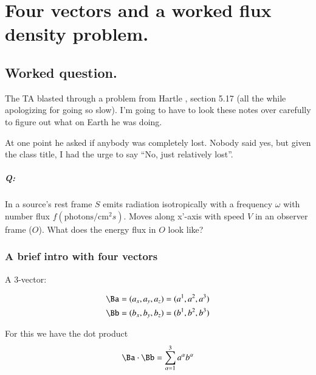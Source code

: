 %
%

\chapter{Four vectors and a worked flux density problem.}
\label{chap:relativisticElectrodynamicsT1}
{}
\date{Jan 20, 2011}

\beginArtNoToc

\section{Worked question.}

The TA blasted through a problem from Hartle \cite{hartle2003gravity}, section 5.17 (all the while apologizing for going so slow).  I'm going to have to look these notes over carefully to figure out what on Earth he was doing.

At one point he asked if anybody was completely lost.  Nobody said yes, but given the class title, I had the urge to say ``No, just relatively lost''.

\paragraph{Q:}
In a source's rest frame $S$ emits radiation isotropically with a frequency $\omega$ with number flux $f(\text{photons}/\text{cm}^2 s)$.  Moves along x'-axis with speed $V$ in an observer frame ($O$).  What does the energy flux in $O$ look like?

\subsection{A brief intro with four vectors}

A 3-vector: 

\begin{align}\label{eqn:relativisticElectrodynamicsT1:10}
\Ba &= (a_x, a_y, a_z) = (a^1, a^2, a^3) \\
\Bb &= (b_x, b_y, b_z) = (b^1, b^2, b^3)
\end{align}

For this we have the dot product
\begin{equation}\label{eqn:relativisticElectrodynamicsT1:20}
\Ba \cdot \Bb = \sum_{\alpha=1}^3 a^\alpha b^\alpha
\end{equation}

